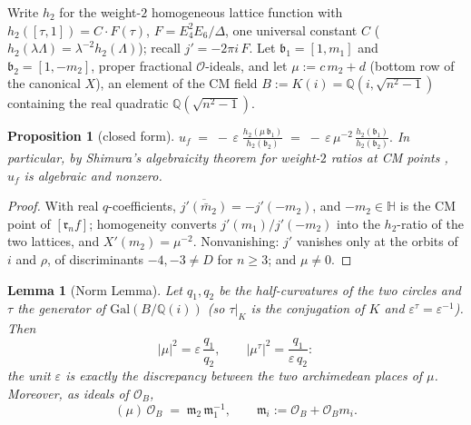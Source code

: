 \documentclass[11pt]{amsart}
\numberwithin{equation}{section}
\theoremstyle{plain}
\newtheorem{proposition}[theorem]{Proposition}
\newtheorem{lemma}[theorem]{Lemma}
\theoremstyle{definition}
\theoremstyle{remark}
\newcommand{\Q}{\mathbb{Q}}
\newcommand{\HH}{\mathbb{H}}
\newcommand{\Gal}{\mathrm{Gal}}
\newcommand{\idealb}{\mathfrak{b}}
\newcommand{\idealm}{\mathfrak{m}}
\newcommand{\idealr}{\mathfrak{r}}
\newcommand{\lat}[1]{\left[#1\right]}
\begin{document}
Write $h_2$ for the weight-$2$ homogeneous lattice function with
$h_2(\lat{\tau, 1}) = C\cdot F(\tau)$, $F = E_4^2E_6/\Delta$, one
universal constant $C$ ($h_2(\lambda\Lambda) =
\lambda^{-2}h_2(\Lambda)$); recall $j' = -2\pi i\,F$.  Let
$\idealb_1 = \lat{1, m_1}$ and $\idealb_2 = \lat{1, -m_2}$, proper
fractional $\mathcal{O}$-ideals, and let $\mu := c\,m_2 + d$ (bottom
row of the canonical $X$), an element of the CM field
$B := K(i) = \Q(i, \sqrt{n^2 - 1})$ containing the real quadratic
$\Q(\sqrt{n^2-1})$.

\begin{proposition}[closed form]\label{prop:closedform}
$\displaystyle
u_f \;=\; -\,\varepsilon\;\frac{h_2(\mu\,\idealb_1)}{h_2(\idealb_2)}
\;=\; -\,\varepsilon\,\mu^{-2}\,
\frac{h_2(\idealb_1)}{h_2(\idealb_2)} .$
In particular, by Shimura's algebraicity theorem for weight-$2$ ratios
at CM points \cite{Shimura1971}, $u_f$ is algebraic and nonzero.
\end{proposition}

\begin{proof}
With real $q$-coefficients, $\overline{j'(\bar m_2)} = -j'(-m_2)$, and
$-m_2 \in \HH$ is the CM point of $[\idealr_nf]$; homogeneity converts
$j'(m_1)/j'(-m_2)$ into the $h_2$-ratio of the two lattices, and
$X'(m_2) = \mu^{-2}$.  Nonvanishing: $j'$ vanishes only at the orbits
of $i$ and $\rho$, of discriminants $-4, -3 \ne D$ for $n \ge 3$; and
$\mu \ne 0$.
\end{proof}

\begin{lemma}[Norm Lemma]\label{lem:norm}
Let $q_1, q_2$ be the half-curvatures of the two circles and $\tau$
the generator of $\Gal(B/\Q(i))$ (so $\tau|_K$ is the conjugation of
$K$ and $\varepsilon^{\tau} = \varepsilon^{-1}$).  Then
\[
  |\mu|^2 = \varepsilon\,\frac{q_1}{q_2},
  \qquad
  |\mu^{\tau}|^2 = \frac{q_1}{\varepsilon\,q_2}:
\]
the unit $\varepsilon$ is exactly the discrepancy between the two
archimedean places of $\mu$.  Moreover, as ideals of $\mathcal{O}_B$,
\[
  (\mu)\,\mathcal{O}_B \;=\; \idealm_2\,\idealm_1^{-1},
  \qquad \idealm_i := \mathcal{O}_B + \mathcal{O}_B m_i .
\]
\end{lemma}
\end{document}
